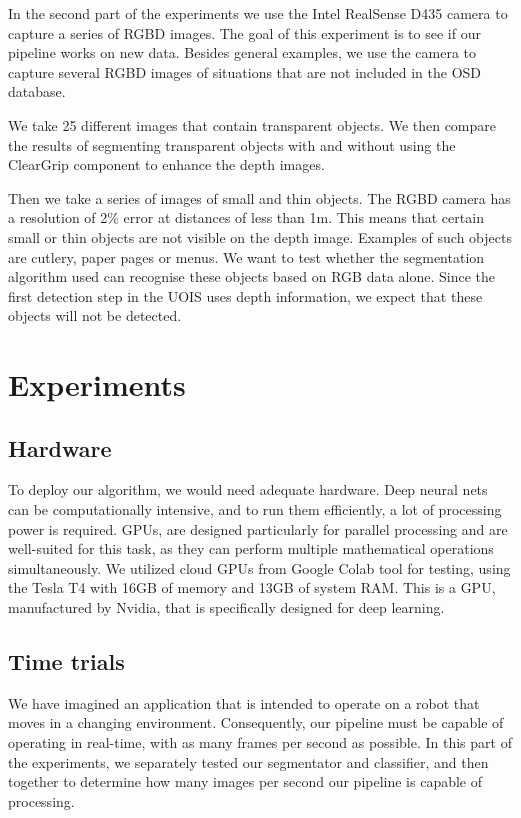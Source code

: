 \documentclass[10pt,twocolumn,letterpaper]{article}
\begin{document}
In the second part of the experiments we use the Intel RealSense D435 camera to capture a series of RGBD images. The goal of this experiment is to see if our pipeline works on new data. Besides general examples, we use the camera to capture several RGBD images of situations that are not included in the OSD database.

We take 25 different images that contain transparent objects. We then compare the results of segmenting transparent objects with and without using the ClearGrip component to enhance the depth images.

Then we take a series of images of small and thin objects. The RGBD camera has a resolution of 2\% error at distances of less than 1m. This means that certain small or thin objects are not visible on the depth image. Examples of such objects are cutlery, paper pages or menus. We want to test whether the segmentation algorithm used can recognise these objects based on RGB data alone. Since the first detection step in the UOIS uses depth information, we expect that these objects will not be detected.

\section{Experiments}

\subsection{Hardware}
To deploy our algorithm, we would need adequate hardware. Deep neural nets can be computationally intensive, and to run them efficiently, a lot of processing power is required. GPUs, are designed particularly for parallel processing and are well-suited for this task, as they can perform multiple mathematical operations simultaneously. We utilized cloud GPUs from Google Colab tool for testing, using the Tesla T4 with 16GB of memory and 13GB of system RAM. This is a GPU, manufactured by Nvidia, that is specifically designed for deep learning.


\subsection{Time trials}

We have imagined an application that is intended to operate on a robot that moves in a changing environment. Consequently, our pipeline must be capable of operating in real-time, with as many frames per second as possible. In this part of the experiments, we separately tested our segmentator and classifier, and then together to determine how many images per second our pipeline is capable of processing.
\end{document}
